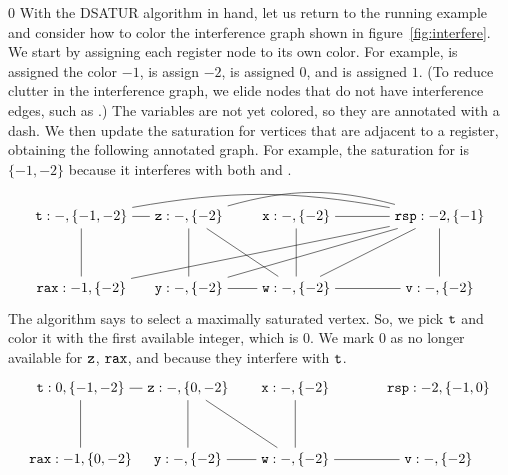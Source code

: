 \documentclass[7x10]{TimesAPriori_MIT}%
\def\racketEd{0}
\def\edition{1}
\numberwithin{theorem}{chapter}
\numberwithin{definition}{chapter}
\numberwithin{equation}{chapter}
\begin{document}
{\if\edition\racketEd      
With the DSATUR algorithm in hand, let us return to the running
example and consider how to color the interference graph shown in
figure~\ref{fig:interfere}.
%
We start by assigning each register node to its own color. For
example,  is assigned the color $-1$,  is assign
$-2$,  is assigned $0$, and  is assigned $1$.
(To reduce clutter in the interference graph, we elide nodes
that do not have interference edges, such as .)
The variables are not yet colored, so they are annotated with a dash. We
then update the saturation for vertices that are adjacent to a
register, obtaining the following annotated graph. For example, the
saturation for  is $\{-1,-2\}$ because it interferes with both
 and .
\[
\begin{tikzpicture}[baseline=(current  bounding  box.center),scale=0.9]
\node (rax) at (0,0) {$\ttm{rax}:-1,\{-2\}$};
\node (rsp) at (10,2) {$\ttm{rsp}:-2,\{-1\}$};
\node (t1) at (0,2) {$\ttm{t}:-,\{-1,-2\}$};
\node (z) at (3,2)  {$\ttm{z}:-,\{-2\}$};
\node (x) at (6,2)  {$\ttm{x}:-,\{-2\}$};
\node (y) at (3,0)  {$\ttm{y}:-,\{-2\}$};
\node (w) at (6,0)  {$\ttm{w}:-,\{-2\}$};
\node (v) at (10,0)  {$\ttm{v}:-,\{-2\}$};

\draw (t1) to (rax);
\draw (t1) to (z);
\draw (z) to (y);
\draw (z) to (w);
\draw (x) to (w);
\draw (y) to (w);
\draw (v) to (w);

\draw (v) to (rsp);
\draw (w) to (rsp);
\draw (x) to (rsp);
\draw (y) to (rsp);
\path[-.,bend left=15] (z) edge node {} (rsp);
\path[-.,bend left=10] (t1) edge node {} (rsp);
\draw (rax) to (rsp);
\end{tikzpicture}
\]
The algorithm says to select a maximally saturated vertex. So, we pick
$\text{\texttt{t}}$ and color it with the first available integer, which is
$0$. We mark $0$ as no longer available for $\text{\texttt{z}}$, $\text{\texttt{rax}}$,
and  because they interfere with $\text{\texttt{t}}$.
\[
\begin{tikzpicture}[baseline=(current  bounding  box.center),scale=0.9]
\node (rax) at (0,0) {$\ttm{rax}:-1,\{0,-2\}$};
\node (rsp) at (10,2) {$\ttm{rsp}:-2,\{-1,0\}$};
\node (t1) at (0,2) {$\ttm{t}:0,\{-1,-2\}$};
\node (z) at (3,2)  {$\ttm{z}:-,\{0,-2\}$};
\node (x) at (6,2)  {$\ttm{x}:-,\{-2\}$};
\node (y) at (3,0)  {$\ttm{y}:-,\{-2\}$};
\node (w) at (6,0)  {$\ttm{w}:-,\{-2\}$};
\node (v) at (10,0)  {$\ttm{v}:-,\{-2\}$};

\draw (t1) to (rax);
\draw (t1) to (z);
\draw (z) to (y);
\draw (z) to (w);
\draw (x) to (w);
\draw (y) to (w);
\draw (v) to (w);


\end{tikzpicture}\]}
\end{document}
